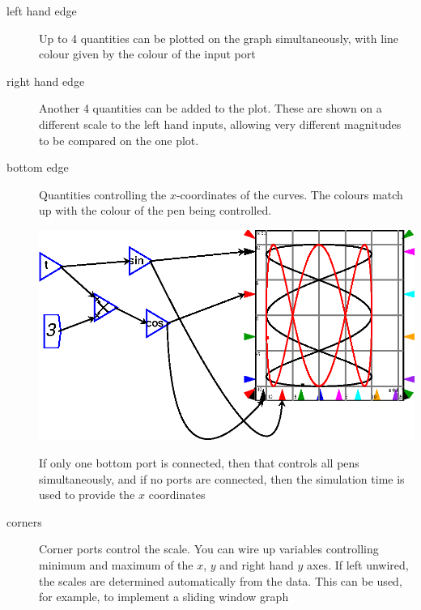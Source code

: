 \begin{description}
\item[left hand edge] Up to 4 quantities can be plotted on the graph
  simultaneously, with line colour given by the colour of the input
  port
\item[right hand edge] Another 4 quantities can be added to the
  plot. These are shown on a different scale to the left hand inputs,
  allowing very different magnitudes to be compared on the one plot.
\item[bottom edge] Quantities controlling the $x$-coordinates of the
  curves. The colours match up with the colour of the pen being
  controlled.

\begin{center}
\includegraphics{images/plotLissajous.eps}
\end{center}

  If only one bottom port is connected, then that controls all pens
  simultaneously, and if no ports are connected, then the simulation
  time is used to provide the $x$ coordinates
\item[corners] Corner ports control the scale. You can wire up
  variables controlling minimum and maximum of the $x$, $y$ and right hand
  $y$ axes. If left unwired, the scales are determined automatically
  from the data. This can be used, for example, to implement a sliding
  window graph


\end{description}
